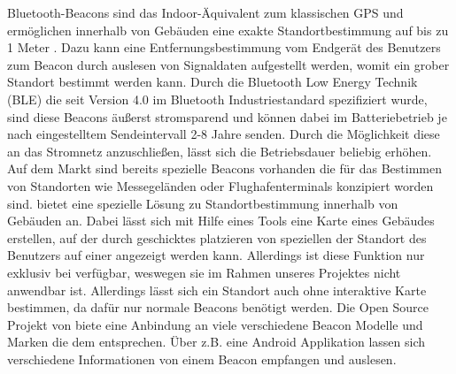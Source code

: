 Bluetooth-Beacons sind das Indoor-Äquivalent zum klassischen GPS und
ermöglichen innerhalb von Gebäuden eine exakte Standortbestimmung auf bis zu
1 Meter \citep{[Quelle](https://www.infsoft.de/technologie/sensorik/bluetooth-low-energy-beacons)}.
Dazu kann eine Entfernungsbestimmung vom Endgerät des Benutzers zum Beacon
durch auslesen von Signaldaten aufgestellt werden, womit ein grober Standort
bestimmt werden kann. Durch die Bluetooth Low Energy Technik (BLE) die seit
Version 4.0 im Bluetooth Industriestandard spezifiziert wurde, sind diese
Beacons äußerst stromsparend und können dabei im Batteriebetrieb je nach
eingestelltem Sendeintervall 2-8 Jahre \citep{[Quelle](https://www.infsoft.de/technologie/sensorik/bluetooth-low-energy-beacons)}
senden. Durch die Möglichkeit diese an das Stromnetz anzuschließen, lässt sich
die Betriebsdauer beliebig erhöhen.
Auf dem Markt sind bereits spezielle Beacons vorhanden die für das Bestimmen
von Standorten wie \zB Messegeländen oder Flughafenterminals konzipiert worden
sind. \citep{[Estimote, Inc.](https://estimote.com/?gclid=CjwKCAiAsejRBRB3EiwAZft7sJe4aSGlbgBgQP5SLAjT3GcxvFdEi754ZzeD8e9jIWHiyNdUdigPEBoC_5cQAvD_BwE)} 
bietet eine spezielle Lösung zu Standortbestimmung innerhalb von Gebäuden an.
Dabei lässt sich mit Hilfe eines Tools eine Karte eines Gebäudes erstellen,
auf der durch geschicktes platzieren von speziellen \citep{[Estimote Beacons](https://estimote.com/products/)} 
der Standort des Benutzers auf einer \citep{[Karte](https://github.com/Estimote/Android-Indoor-SDK)}
angezeigt werden kann. Allerdings ist diese Funktion nur exklusiv bei \citep{[Estimote, Inc.](https://estimote.com/?gclid=CjwKCAiAsejRBRB3EiwAZft7sJe4aSGlbgBgQP5SLAjT3GcxvFdEi754ZzeD8e9jIWHiyNdUdigPEBoC_5cQAvD_BwE)}
verfügbar, weswegen sie im Rahmen unseres Projektes nicht anwendbar ist.
Allerdings lässt sich ein Standort auch ohne interaktive Karte bestimmen, da
dafür nur normale Beacons benötigt werden. Die Open Source Projekt \citep{[Android Beacon Library](http://altbeacon.github.io/android-beacon-library/index.html)}
von \citep{[Radius Networks](https://www.radiusnetworks.com/)} biete eine
Anbindung an viele verschiedene Beacon Modelle und Marken die dem \citep{[AltBeacon Standard](http://altbeacon.org/)}
entsprechen. Über z.B. eine Android Applikation lassen sich verschiedene
Informationen von einem Beacon empfangen und auslesen.

